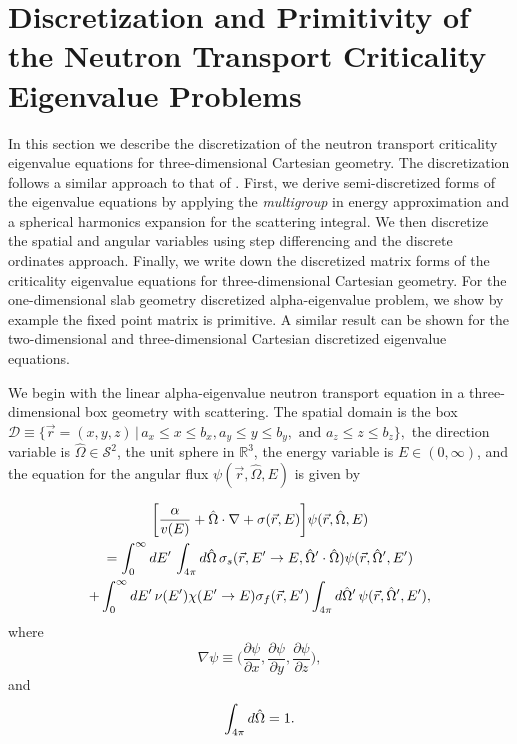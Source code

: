 \chapter{Discretization and Primitivity of the Neutron Transport Criticality Eigenvalue Problems}

In this section we describe the discretization of the neutron transport criticality eigenvalue equations for three-dimensional Cartesian geometry. The discretization follows a similar approach to that of \cite{brown_linear_1995} \cite{brown_POI_2008} \cite{brown_POI_2012}. First, we derive semi-discretized forms of the eigenvalue equations by applying the \textit{multigroup} in energy approximation and a spherical harmonics expansion for the scattering integral. We then discretize the spatial and angular variables using step differencing and the discrete ordinates approach. Finally, we write down the discretized matrix forms of the criticality eigenvalue equations for three-dimensional Cartesian geometry. For the one-dimensional slab geometry discretized alpha-eigenvalue problem, we show by example the fixed point matrix is primitive. A similar result can be shown for the two-dimensional and three-dimensional Cartesian discretized eigenvalue equations.

We begin with the linear alpha-eigenvalue neutron transport equation in a three-dimensional box geometry with scattering. The spatial domain is the box $\mathcal{D} \equiv \{\vec{r} = (x, y, z) \, \vert \, a_{x} \leq x \leq b_{x}, a_{y} \leq y \leq b_{y}, \text{ and } a_{z} \leq z \leq b_{z} \},$ the direction variable is $\hat{\Omega} \in \mathcal{S}^{2}$, the unit sphere in $\mathbb{R}^{3}$, the energy variable is $E \in (0, \infty)$, and the equation for the angular flux $\psi(\vec{r}, \hat{\Omega}, E)$ is given by

\begin{multline}
	\bigg [ \frac{\alpha}{v(E)} + \hat{\Omega} \cdot \nabla + \sigma(\vec{r},E) \bigg ] \psi(\vec{r},\hat{\Omega},E) \\ = \int_{0}^{\infty} \mathop{}\!d E' \, \int_{4\pi} \mathop{}\!d \hat{\Omega} \, \sigma_{s}(\vec{r},E'\rightarrow E,\hat{\Omega}' \cdot \hat{\Omega}) \psi(\vec{r},\hat{\Omega}',E') \\ + \int_{0}^{\infty} \mathop{}\!d E' \, \nu(E') \chi(E'\rightarrow E) \sigma_{f}(\vec{r},E') \int_{4\pi} \mathop{}\!d \hat{\Omega}' \, \psi(\vec{r},\hat{\Omega}',E'), 
	\label{eq:Alpha3DNeutronTransport}
\end{multline}
where
\begin{equation}
	\nabla \psi \equiv \bigg (\frac{\partial \psi}{\partial x}, \frac{\partial \psi}{\partial y}, \frac{\partial \psi}{\partial z} \bigg ),
\end{equation}
and
\begin{equation}
	 \int_{4\pi} \mathop{}\!d \hat{\Omega} = 1.
\end{equation}

